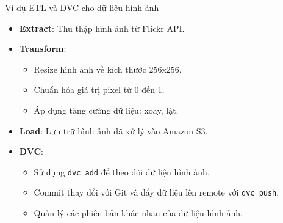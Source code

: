 \documentclass{beamer}
\begin{document}
\begin{frame}{Ví dụ ETL và DVC cho dữ liệu hình ảnh}
    \begin{itemize}
        \item \textbf{Extract}: Thu thập hình ảnh từ Flickr API.
        \item \textbf{Transform}:
        \begin{itemize}
            \item Resize hình ảnh về kích thước 256x256.
            \item Chuẩn hóa giá trị pixel từ 0 đến 1.
            \item Áp dụng tăng cường dữ liệu: xoay, lật.
        \end{itemize}
        \item \textbf{Load}: Lưu trữ hình ảnh đã xử lý vào Amazon S3.
        \item \textbf{DVC}:
        \begin{itemize}
            \item Sử dụng \texttt{dvc add} để theo dõi dữ liệu hình ảnh.
            \item Commit thay đổi với Git và đẩy dữ liệu lên remote với \texttt{dvc push}.
            \item Quản lý các phiên bản khác nhau của dữ liệu hình ảnh.
        \end{itemize}
    \end{itemize}
\end{frame}
\end{document}

